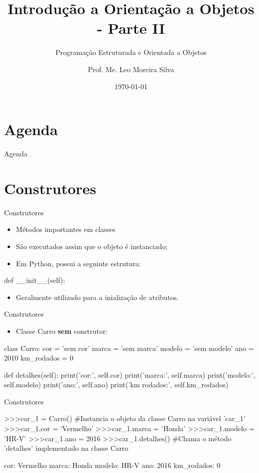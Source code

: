 \documentclass{beamer}
\title{Introdução a Orientação a Objetos - Parte II}
\subtitle{Programação Estruturada e Orientada a Objetos}
\author{Prof. Me. Leo Moreira Silva}
\date{\today}
\begin{document}
{ 
\frame{\titlepage}}

\section*{Agenda}\begin{frame}{Agenda}\tableofcontents\end{frame}

\section{Construtores}

\begin{frame}[fragile]{Construtores}
    \begin{itemize}
        \item Métodos importantes em classes
        \item São executados assim que o objeto é instanciado;
        \item Em Python, possui a seguinte estrutura:
    \end{itemize}
    \small
    \begin{semiverbatim}
        def __init__(self):
    \end{semiverbatim}
    \begin{itemize}
        \item Geralmente utilizado para a inialização de atributos.
    \end{itemize}
\end{frame}

\begin{frame}[fragile]{Construtores}
    \begin{itemize}
        \item Classe Carro \textbf{sem} construtor:
    \end{itemize}
    \small
    \begin{semiverbatim}
    class Carro:
        cor = 'sem cor'
        marca = 'sem marca'
        modelo = 'sem modelo'
        ano = 2010
        km_rodados = 0
    
        def detalhes(self):
            print('cor:', self.cor)
            print('marca:', self.marca)
            print('modelo:', self.modelo)
            print('ano:', self.ano)
            print('km rodados:', self.km_rodados)
    \end{semiverbatim}
\end{frame}

\begin{frame}[fragile]{Construtores}
    \scriptsize
    \begin{semiverbatim}
    >>>car_1 = Carro() #Instancia o objeto da classe Carro na variável 'car_1'
    >>>car_1.cor = 'Vermelho'
    >>>car_1.marca = 'Honda'
    >>>car_1.modelo = 'HR-V'
    >>>car_1.ano = 2016
    >>>car_1.detalhes() #Chama o método 'detalhes' implementado na classe Carro
    
    cor: Vermelho
    marca: Honda
    modelo: HR-V
    ano: 2016
    km_rodados: 0
    \end{semiverbatim}
\end{frame}
\end{document}
